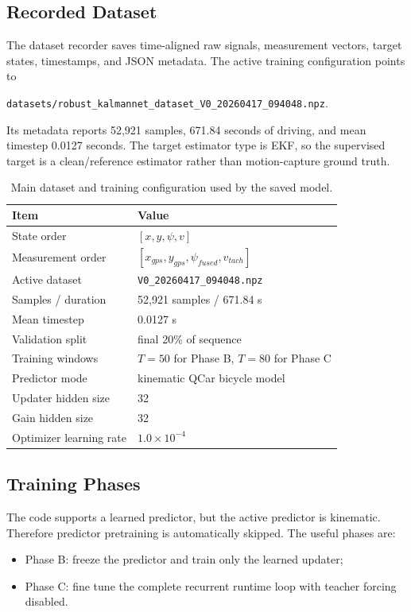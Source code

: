 \documentclass[11pt,a4paper]{article}
\begin{document}
\subsection{Recorded Dataset}

The dataset recorder saves time-aligned raw signals, measurement vectors,
target states, timestamps, and JSON metadata. The active training configuration
points to
\begin{center}
\texttt{datasets/robust\_kalmannet\_dataset\_V0\_20260417\_094048.npz}.
\end{center}
Its metadata reports 52,921 samples, 671.84 seconds of driving, and mean
timestep 0.0127 seconds. The target estimator type is EKF, so the supervised
target is a clean/reference estimator rather than motion-capture ground truth.

\begin{table}[htbp]
\centering
\caption{Main dataset and training configuration used by the saved model.}
\label{tab:dataset}
\begin{tabular}{ll}
\toprule
Item & Value \\
\midrule
State order & $[x,y,\psi,v]$ \\
Measurement order & $[x_{gps},y_{gps},\psi_{fused},v_{tach}]$ \\
Active dataset & \texttt{V0\_20260417\_094048.npz} \\
Samples / duration & 52,921 samples / 671.84 s \\
Mean timestep & 0.0127 s \\
Validation split & final 20\% of sequence \\
Training windows & $T=50$ for Phase B, $T=80$ for Phase C \\
Predictor mode & kinematic QCar bicycle model \\
Updater hidden size & 32 \\
Gain hidden size & 32 \\
Optimizer learning rate & $1.0\times10^{-4}$ \\
\bottomrule
\end{tabular}
\end{table}

\subsection{Training Phases}

The code supports a learned predictor, but the active predictor is kinematic.
Therefore predictor pretraining is automatically skipped. The useful phases are:
\begin{itemize}
  \item Phase B: freeze the predictor and train only the learned updater;
  \item Phase C: fine tune the complete recurrent runtime loop with teacher
  forcing disabled.
\end{itemize}
\end{document}
